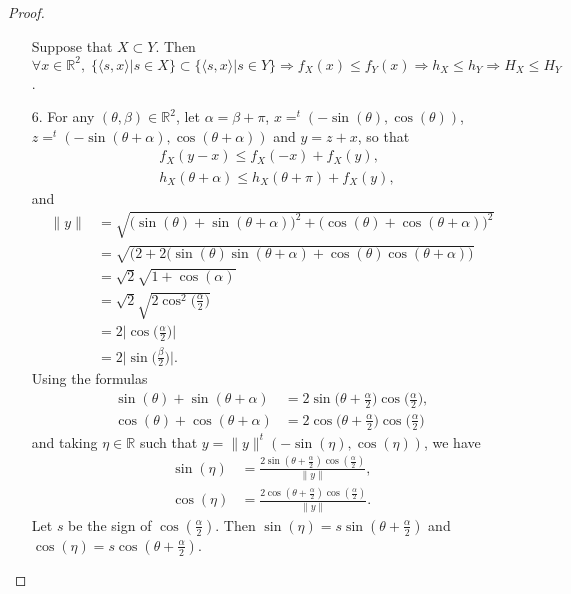 \documentclass[numbers,compress,v1.0.1]{vmsta}
\theoremstyle{definition}
\def\<{\langle}
\def\>{\rangle}
\begin{document}
\begin{proof}
\begin{enumerate}[1,~2,~3.]
Suppose that $X\subset Y$. Then $\forall x\in\mathbb{R}^2,\; \lbrace\<
s,x\>\vert s\in X\rbrace\subset\lbrace\<s,x\>\vert s\in Y\rbrace
\Rightarrow f_X(x)\leq f_Y(x)\Rightarrow h_X\leq h_Y\Rightarrow H_X\leq H_Y$.
%
\item[6.] For any $(\theta,\beta)\in\mathbb{R}^2$, let $\alpha=\beta+\pi
$, $x=^t(-\sin(\theta),\cos(\theta))$, $z=^t(-\sin(\theta+\alpha),\cos
(\theta+\alpha))$ and $y=z+x$, so that
%
\begin{align*}
&f_X(y-x)\leq f_X(-x)+f_X(y),
\\
& h_X(\theta+\alpha)\leq h_X(\theta+
\pi)+f_X(y),
\end{align*}
%
and
%
\begin{align*}
{\parallel} y{\parallel}&=\sqrt{\bigl(\sin(\theta)+\sin(\theta+\alpha)\bigr)^2+ \bigl(\cos (\theta)+\cos(\theta+\alpha)\bigr)^2}\\
&=\sqrt{(2+2\bigl(\sin(\theta)\sin(\theta+\alpha)+ \cos(\theta)\cos(\theta + \alpha)\bigr)}\\
&=\sqrt{2}\sqrt{1+\cos(\alpha)}\\
&=\sqrt{2}\sqrt{2\cos^2\biggl(\frac{\alpha}{2}\biggr)}\\
&=2\biggl\vert\cos\biggl(\frac{\alpha}{2}\biggr)\biggr\vert\\
&=2\biggl\vert\sin\biggl(\frac{\beta}{2}\biggr)\biggr\vert.
\end{align*}
%
Using the formulas
%
\begin{align*}
\sin(\theta)+\sin(\theta+\alpha) &=2\sin\biggl(\theta+\frac{\alpha}{2}\biggr)
\cos \biggl(\frac{\alpha}{2}\biggr),
\\
\cos(\theta)+\cos(\theta+\alpha) &=2\cos\biggl(\theta+\frac{\alpha}{2}\biggr)
\cos \biggl(\frac{\alpha}{2}\biggr)
\end{align*}
%
and taking $\eta\in\mathbb{R}$ such that $y=\parallel y\parallel
^t(-\sin(\eta),\cos(\eta))$, we have
%
\begin{align*}
\sin(\eta) &=\frac{2\sin(\theta+\frac{\alpha}{2})\cos(\frac{\alpha
}{2})}{\parallel y\parallel},
\\
\cos(\eta) &=\frac{2\cos(\theta+\frac{\alpha}{2})\cos(\frac{\alpha
}{2})}{\parallel y\parallel}.
\end{align*}
%
Let $s$ be the sign of $\cos(\frac{\alpha}{2})$. Then $\sin(\eta) =s\sin
(\theta+\frac{\alpha}{2})$ and $\cos(\eta) =s\cos(\theta+\frac{\alpha
}{2})$.


\end{enumerate}
\end{proof}
\end{document}
